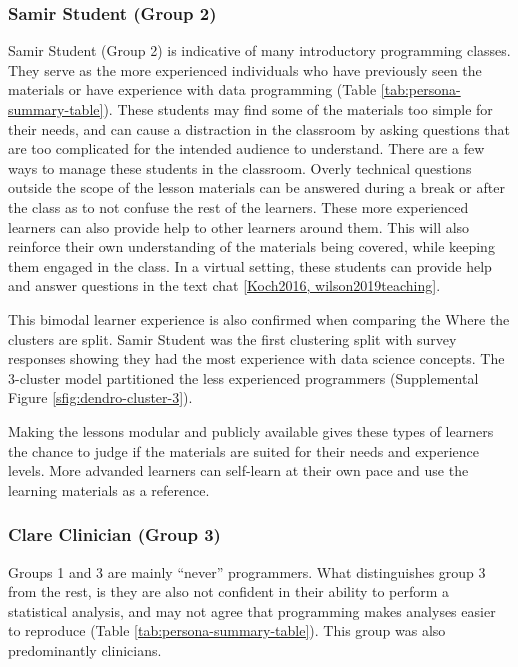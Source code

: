 \documentclass[020-persona\_validation.tex]{subfiles}
\begin{document}
        \subsubsection{Samir Student (Group 2)}

            Samir Student (Group 2) is indicative of many introductory programming classes.
            They serve as the more experienced individuals who have previously seen the materials
            or have experience with data programming (Table \ref{tab:persona-summary-table}).
            These students may find some of the materials too simple for their needs,
            and can cause a distraction in the classroom by asking questions that are too complicated
            for the intended audience to understand.
            There are a few ways to manage these students in the classroom.
            Overly technical questions outside the scope of the lesson materials
            can be answered during a break or after the class as to not confuse the rest of the learners.
            These more experienced learners can also provide help to other learners around them.
            This will also reinforce their own understanding of the materials being covered,
            while keeping them engaged in the class.
            In a virtual setting,
            these students can provide help and answer questions in the text chat
            \ref{Koch2016, wilson2019teaching}.

            This bimodal learner experience is also confirmed when comparing the
            Where the clusters are split.
            Samir Student was the first clustering split with survey responses showing
            they had the most experience with data science concepts.
            The 3-cluster model partitioned the less experienced programmers
            (Supplemental Figure \ref{sfig:dendro-cluster-3}).

            Making the lessons modular and publicly available
            gives these types of learners the chance to judge if the materials are suited for their needs
            and experience levels.
            More advanded learners can self-learn at their own pace and use the learning materials as a reference.

        \subsubsection{Clare Clinician (Group 3)}

            Groups 1 and 3 are mainly ``never'' programmers.
            What distinguishes group 3 from the rest, is they are also not confident in
            their ability to perform a statistical analysis,
            and may not agree that programming makes analyses easier to reproduce (Table \ref{tab:persona-summary-table}).
            This group was also predominantly clinicians.
\end{document}
